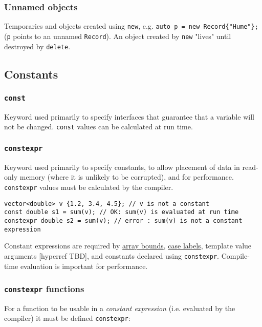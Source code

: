 \documentclass[8pt, table, xcdraw]{article}%
\begin{document}
\subsubsection{Unnamed objects}
Temporaries and objects created using \lstinline{new}, e.g. \lstinline|auto p = new Record{"Hume"};| (\lstinline{p} points to an unnamed \lstinline{Record}). An object created by \lstinline{new} "lives" until destroyed by \lstinline{delete}.

\subsection{Constants}

\subsubsection{\lstinline{const}}
Keyword used primarily to specify interfaces that guarantee that a variable will not be changed. \lstinline{const} values can be calculated at run time.

\subsubsection{\lstinline{constexpr}} \label{constexpr}
Keyword used  primarily to specify constants, to allow placement of data in read-only memory (where it is unlikely to be corrupted), and for performance. \lstinline{constexpr} values must be calculated by the compiler.

\begin{lstlisting}
vector<double> v {1.2, 3.4, 4.5}; // v is not a constant
const double s1 = sum(v); // OK: sum(v) is evaluated at run time
constexpr double s2 = sum(v); // error : sum(v) is not a constant expression
\end{lstlisting}

Constant expressions are required by \hyperref[array]{array bounds}, \hyperref[switch]{case labels}, template value arguments [hyperref TBD], and constants declared using \lstinline{constexpr}. Compile-time evaluation is important for performance.

\subsubsection{\lstinline{constexpr} functions}

For a function to be usable in a \textit{constant expression} (i.e. evaluated by the compiler) it must be defined \lstinline{constexpr}:
\end{document}
